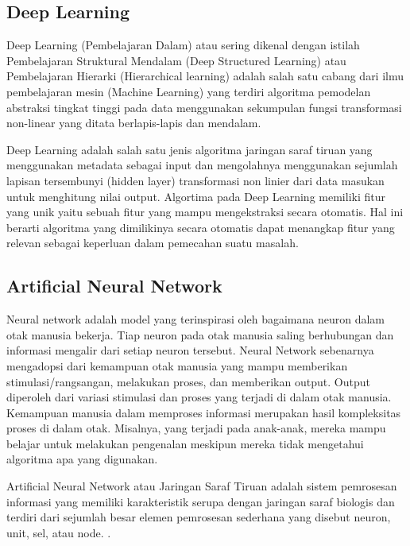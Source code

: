 \subsection{Deep Learning}
Deep Learning (Pembelajaran Dalam) atau sering dikenal dengan istilah Pembelajaran Struktural Mendalam (Deep Structured Learning) atau Pembelajaran Hierarki (Hierarchical learning) adalah salah satu cabang dari ilmu pembelajaran mesin (Machine Learning) yang terdiri algoritma pemodelan abstraksi tingkat tinggi pada data menggunakan sekumpulan fungsi transformasi non-linear yang ditata berlapis-lapis dan mendalam.

Deep Learning adalah salah satu jenis algoritma jaringan saraf tiruan yang menggunakan metadata sebagai input dan mengolahnya menggunakan sejumlah lapisan tersembunyi (hidden layer) transformasi non linier dari data masukan untuk menghitung nilai output. Algortima pada Deep Learning memiliki fitur yang unik yaitu sebuah fitur yang mampu mengekstraksi secara otomatis. Hal ini berarti algoritma yang dimilikinya secara otomatis dapat menangkap fitur yang relevan sebagai keperluan dalam pemecahan suatu masalah. \cite{brownlee2014machine}

\subsection{Artificial Neural Network}
Neural network adalah model yang terinspirasi oleh bagaimana neuron dalam otak manusia bekerja. Tiap neuron pada otak manusia saling berhubungan dan informasi mengalir dari setiap neuron tersebut. Neural Network sebenarnya mengadopsi dari kemampuan otak manusia yang mampu memberikan stimulasi/rangsangan, melakukan proses, dan memberikan output. Output diperoleh dari variasi stimulasi dan proses yang terjadi di dalam otak manusia. Kemampuan manusia dalam memproses informasi merupakan hasil kompleksitas proses di dalam otak. Misalnya, yang terjadi pada anak-anak, mereka mampu belajar untuk melakukan pengenalan meskipun mereka tidak mengetahui algoritma apa yang digunakan. 

Artificial Neural Network atau Jaringan Saraf Tiruan adalah sistem pemrosesan informasi yang memiliki karakteristik serupa dengan jaringan saraf biologis dan terdiri dari sejumlah besar elemen pemrosesan sederhana yang disebut neuron, unit, sel, atau node. \cite{irwansyah2015advanced}.






